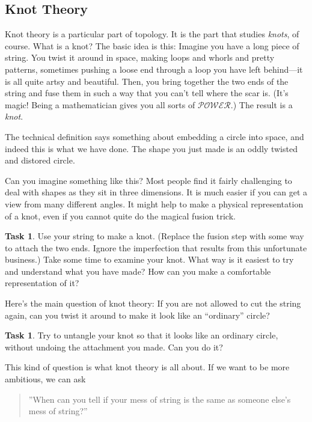 \documentclass[12pt,letterpaper]{article}
\theoremstyle{definition}
\newtheorem{task}[question]{Task}
\begin{document}
\subsection*{Knot Theory}

Knot theory is a particular part of topology. 
It is the part that studies \emph{knots}, of course.
What is a knot?
The basic idea is this:
Imagine you have a long piece of string.
You twist it around in space, making loops and whorls and pretty patterns, sometimes pushing a loose end through a loop you have left behind---it is all quite artsy and beautiful.
Then, you bring together the two ends of the string and fuse them in such a way that you can't tell where the scar is.
(It's magic!
Being a mathematician gives you all sorts of 
$\mathcal{POWER}$.)
The result is a \emph{knot}.

The technical definition says something about embedding a circle into space, and indeed this is what we have done.
The shape you just made is an oddly twisted and distored circle.

Can you imagine something like this?
Most people find it fairly challenging to deal with shapes as they sit in three dimensions.
It is much easier if you can get a view from many different angles.
It might help to make a physical representation of a knot, even if you cannot quite do the magical fusion trick.

\begin{task}
Use your string to make a knot.
(Replace the fusion step with some way to attach the two ends. 
Ignore the imperfection that results from this unfortunate business.)
Take some time to examine your knot.
What way is it easiest to try and understand what you have made?
How can you make a comfortable representation of it?
\end{task}

Here's the main question of knot theory: If you are not allowed to cut the string again, can you twist it around to make it look like an ``ordinary'' circle?

\begin{task}
Try to untangle your knot so that it looks like an ordinary circle, without undoing the attachment you made. Can you do it?
\end{task}

This kind of question is what knot theory is all about.
If we want to be more ambitious, we can ask
\begin{quote}
''When can you tell if your mess of string is the same as someone else's mess of string?''
\end{quote}
\end{document}
